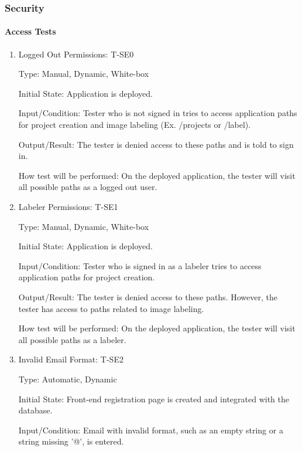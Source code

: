 \documentclass[12pt, titlepage]{article}
\begin{document}
\subsubsection{Security}
		
\paragraph{Access Tests}

\begin{enumerate}

\item{Logged Out Permissions: T-SE0\\}

Type: Manual, Dynamic, White-box
					
Initial State: Application is deployed.
					
Input/Condition: Tester who is not signed in tries to access application paths for project creation and image labeling (Ex. /projects or /label).
					
Output/Result: The tester is denied access to these paths and is told to sign in.
					
How test will be performed: On the deployed application, the tester will visit all possible paths as a logged out user.

\item{Labeler Permissions: T-SE1\\}

Type: Manual, Dynamic, White-box
					
Initial State: Application is deployed.
					
Input/Condition: Tester who is signed in as a labeler tries to access application paths for project creation.
					
Output/Result: The tester is denied access to these paths. However, the tester has access to paths related to image labeling.
					
How test will be performed: On the deployed application, the tester will visit all possible paths as a labeler.

\item{Invalid Email Format: T-SE2\\}

Type: Automatic, Dynamic
					
Initial State: Front-end registration page is created and integrated with the database.
					
Input/Condition: Email with invalid format, such as an empty string or a string missing '@', is entered.
					

\end{enumerate}
\end{document}
